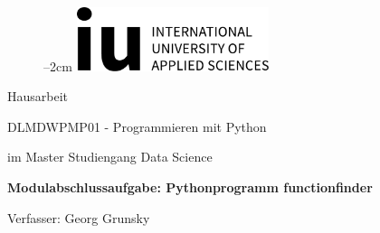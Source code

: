 
\label{titlePage}
\begin{figure}[h]
\centering
\advance\leftskip--2cm
\includegraphics[width=0.50\textwidth]{pics/logo.pdf}
\end{figure}
\FloatBarrier

\vspace*{5mm}

\begin{Large} 
\begin{center}
Hausarbeit
\end{center}
\end{Large} 

\vspace*{5mm}

\begin{Large} 
\begin{center}
DLMDWPMP01 - Programmieren mit Python
\end{center}
\end{Large} 

\begin{large} 
\begin{center}
im Master Studiengang Data Science
\end{center}
\end{large}

\vspace*{15mm}

\begin{Large} 
\begin{center}
\textbf{Modulabschlussaufgabe: Pythonprogramm \glqq functionfinder\grqq}
\end{center}
\end{Large}

\vspace*{20mm}

\begin{large} 
\begin{center}
Verfasser: Georg Grunsky
\end{center}
\end{large} 

\vspace*{-6mm}

